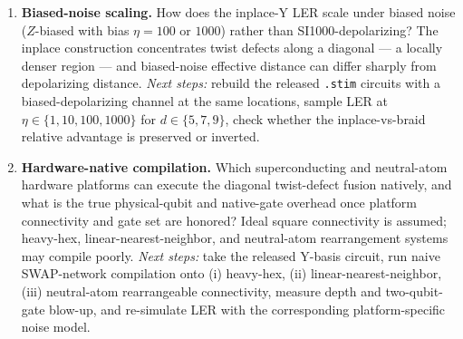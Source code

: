 \begin{enumerate}
\item \textbf{Biased-noise scaling.} How does the inplace-Y LER scale under
biased noise ($Z$-biased with bias $\eta = 100$ or $1000$) rather than
SI1000-depolarizing? The inplace construction concentrates twist defects along
a diagonal --- a locally denser region --- and biased-noise effective distance
can differ sharply from depolarizing distance. \emph{Next steps:} rebuild the
released \texttt{.stim} circuits with a biased-depolarizing channel at the
same locations, sample LER at $\eta \in \{1, 10, 100, 1000\}$ for
$d \in \{5, 7, 9\}$, check whether the inplace-vs-braid relative advantage is
preserved or inverted.

\item \textbf{Hardware-native compilation.} Which superconducting and
neutral-atom hardware platforms can execute the diagonal twist-defect fusion
natively, and what is the true physical-qubit and native-gate overhead once
platform connectivity and gate set are honored? Ideal square connectivity is
assumed; heavy-hex, linear-nearest-neighbor, and neutral-atom rearrangement
systems may compile poorly. \emph{Next steps:} take the released Y-basis
circuit, run naive SWAP-network compilation onto (i) heavy-hex,
(ii) linear-nearest-neighbor, (iii) neutral-atom rearrangeable connectivity,
measure depth and two-qubit-gate blow-up, and re-simulate LER with the
corresponding platform-specific noise model.

\end{enumerate}
